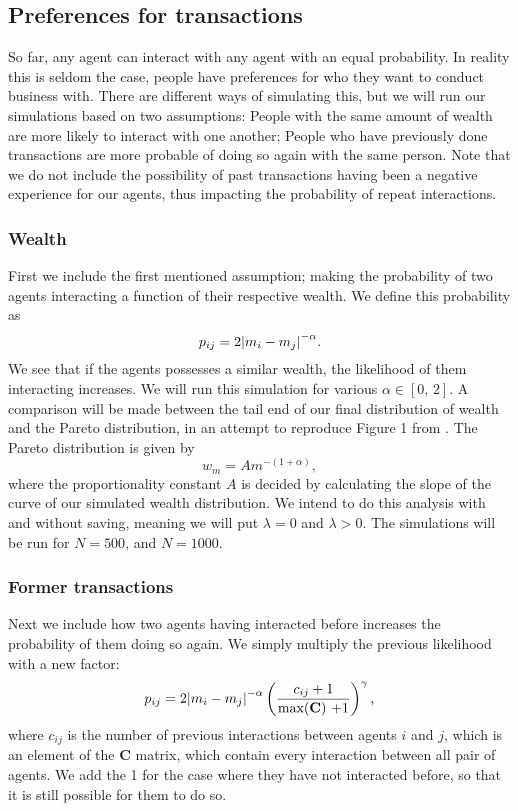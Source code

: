 \documentclass[a4paper,10pt,english]{article}
\begin{document}
\subsection{Preferences for transactions}
So far, any agent can interact with any agent with an equal probability. In reality this is seldom the case, people have preferences for who they want to conduct business with. There are different ways of simulating this, but we will run our simulations based on two assumptions: People with the same amount of wealth are more likely to interact with one another; People who have previously done transactions are more probable of doing so again with the same person. Note that we do not include the possibility of past transactions having been a negative experience for our agents, thus impacting the probability of repeat interactions.
\subsubsection{Wealth}
First we include the first mentioned assumption; making the probability of two agents interacting a function of their respective wealth. We define this probability as
\begin{equation}
p_{ij} = 2 \abs{m_i-m_j}^{-\alpha}.
\end{equation}
We see that if the agents possesses a similar wealth, the likelihood of them interacting increases. We will run this simulation for various $\alpha \in [0,\,2]$.
 A comparison will be made between the tail end of our final distribution of wealth and the Pareto distribution, in an attempt to reproduce Figure 1 from \citet{Goswami}. 
 The Pareto distribution is given by
\begin{equation}
w_m =A m^{-(1+\alpha)},
\end{equation}
where the proportionality constant $A$ is decided by calculating the slope of the curve of our simulated wealth distribution. 
We intend to do this analysis with and without saving, meaning we will put $\lambda=0$ and $\lambda>0$. The simulations will be run for $N=500$, and $N=1000$.

\subsubsection{Former transactions}
 Next we include how two agents having interacted before increases the probability of them doing so again. We simply multiply the previous likelihood with a new factor:
\begin{equation}
p_{ij} = 2 \abs{m_i-m_j}^{-\alpha}\left(\frac{c_{ij} + 1}{\text{max(\textbf{C}) +1}}\right)^\gamma,
\end{equation} 
where $c_{ij}$ is the number of previous interactions between agents $i$ and $j$, which is an element of the $\textbf{C}$ matrix, which contain every interaction between all pair of agents. We add the 1 for the case where they have not interacted before, so that it is still possible for them to do so.
\end{document}

